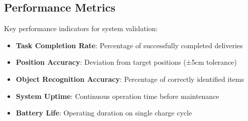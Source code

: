 \subsection{Performance Metrics}
Key performance indicators for system validation:

\begin{itemize}
\item \textbf{Task Completion Rate}: Percentage of successfully completed deliveries
\item \textbf{Position Accuracy}: Deviation from target positions (±5cm tolerance)
\item \textbf{Object Recognition Accuracy}: Percentage of correctly identified items
\item \textbf{System Uptime}: Continuous operation time before maintenance
\item \textbf{Battery Life}: Operating duration on single charge cycle
\end{itemize}
